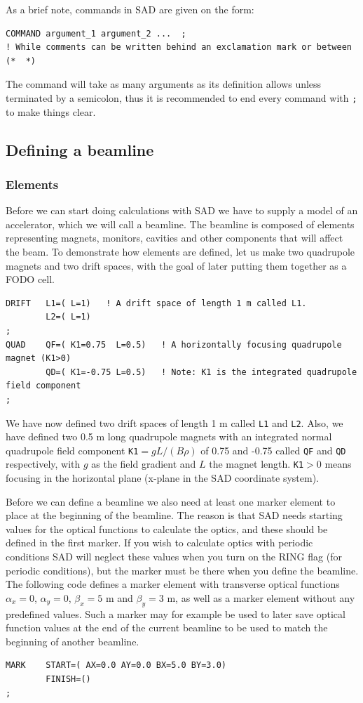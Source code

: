 \documentclass{article}
\begin{document}
As a brief note, commands in SAD are given on the form: %
\begin{lstlisting}
COMMAND argument_1 argument_2 ...  ;
! While comments can be written behind an exclamation mark or between (*  *)
\end{lstlisting}
The command will take as many arguments as its definition allows unless terminated by a semicolon, thus it is recommended to end every command with \texttt{;} to make things clear.

\subsection{Defining a beamline}

\subsubsection{Elements}
Before we can start doing calculations with SAD we have to supply a model of an accelerator, which we will call a beamline.
The beamline is composed of elements representing magnets, monitors, cavities and other components that will affect the beam. To demonstrate how elements are defined, let us make two quadrupole magnets and two drift spaces, with the goal of later putting them together as a FODO cell.
\begin{lstlisting}
DRIFT   L1=( L=1)   ! A drift space of length 1 m called L1.
        L2=( L=1)
;
QUAD    QF=( K1=0.75  L=0.5)   ! A horizontally focusing quadrupole magnet (K1>0)
        QD=( K1=-0.75 L=0.5)   ! Note: K1 is the integrated quadrupole field component
;
\end{lstlisting}
We have now defined two drift spaces of length 1 m called \texttt{L1} and \texttt{L2}. Also, we have defined two 0.5 m long quadrupole magnets with an integrated normal quadrupole field component \texttt{K1}$=gL/(B\rho)$ of 0.75 and -0.75 called \texttt{QF} and \texttt{QD} respectively, with $g$ as the field gradient and $L$ the magnet length. \texttt{K1}$>0$ means focusing in the horizontal plane (x-plane in the SAD coordinate system).
\par
Before we can define a beamline we also need at least one marker element to place at the beginning of the beamline. The reason is that SAD needs starting values for the optical functions to calculate the optics, and these should be defined in the first marker. If you wish to calculate optics with periodic conditions SAD will neglect these values when you turn on the RING flag (for periodic conditions), but the marker must be there when you define the beamline. The following code defines a marker element with transverse optical functions $\alpha_x=0$, $\alpha_y=0$, $\beta_x=5$ m and $\beta_y=3$ m, as well as a marker element without any predefined values. Such a marker may for example be used to later save optical function values at the end of the current beamline to be used to match the beginning of another beamline.
\begin{lstlisting}
MARK    START=( AX=0.0 AY=0.0 BX=5.0 BY=3.0)
        FINISH=()
;
\end{lstlisting}
\end{document}
